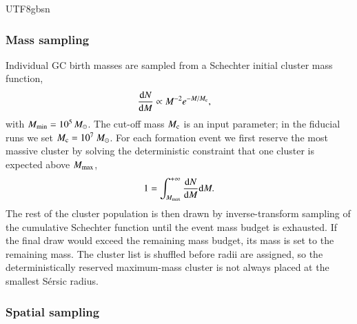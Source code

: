 \documentclass[trackchanges, twocolappendix, twocolumn]{aastex701}
\begin{document}
\begin{CJK*}{UTF8}{gbsn}
\subsubsection{Mass sampling} \label{subsubsect:mass_sampling}

Individual GC birth masses are sampled from a Schechter initial cluster mass function,
\begin{align}
\dfrac{\mathrm{d} N}{\mathrm{d} M} & \propto M^{-2} e^{-M / M_{\rm c}} ,
\label{eq:cimf}
\end{align}
with $M_{\rm min} = 10^5\,M_\odot$. The cut-off mass $M_{\rm c}$ is an input parameter; in the fiducial runs we set $M_{\rm c} = 10^7~M_\odot$. For each formation event we first reserve the most massive cluster by solving the deterministic constraint that one cluster is expected above $M_{\rm max}$,
\begin{align}
1 = \int_{M_{\rm max}}^{+ \infty} \dfrac{\mathrm{d} N}{\mathrm{d}M} \mathrm{d} M .
\end{align}
The rest of the cluster population is then drawn by inverse-transform sampling of the cumulative Schechter function until the event mass budget is exhausted. If the final draw would exceed the remaining mass budget, its mass is set to the remaining mass. The cluster list is shuffled before radii are assigned, so the deterministically reserved maximum-mass cluster is not always placed at the smallest S{\'e}rsic radius.

\subsubsection{Spatial sampling} \label{subsubsect:spatial_sampling}


\end{CJK*}
\end{document}

